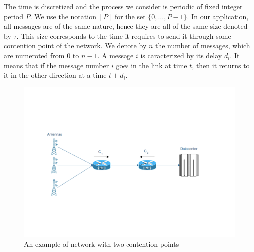 \documentclass[10pt, conference, letterpaper]{IEEEtran}
\begin{document}
The time is discretized and the process we consider is periodic of fixed integer period $P$. We use the notation $[P]$ for the set $\{0,\dots,P-1\}$. In our application, all messages are of the same nature, hence they are all of the same size denoted by $\tau$. This size corresponds to the time it requires to send it through some contention point of the network.
We denote by $n$ the number of messages, which are numeroted from $0$ to $n-1$. A message $i$ is caracterized by its delay $d_i$. It means that if the message number $i$ goes in the link at time $t$, then it returns to it in the other direction at a time $t + d_i$. 
\begin{center}
\begin{figure}
\centering
\includegraphics[scale=0.35]{network.pdf}
\centering
{}
\caption{An example of network with two contention points}
\end{figure}
\end{center}
\end{document}
